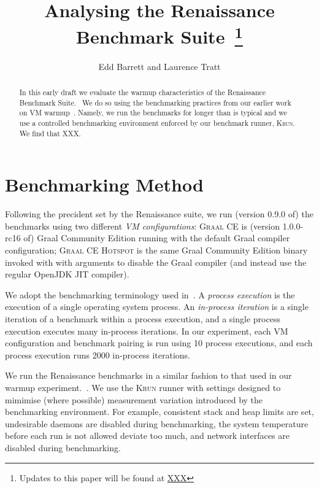 \documentclass[a4paper]{article}
\newcommand{\krun}{\textsc{Krun}\xspace}
\newcommand{\graalce}{\textsc{Graal CE}\xspace}
\newcommand{\graalcehs}{\textsc{Graal CE Hotspot}\xspace}
\begin{document}
\title{Analysing the Renaissance Benchmark Suite~\footnote{Updates to this paper will be found at \url{XXX}}}

\author{Edd Barrett and Laurence Tratt}

\maketitle

\begin{abstract}
\noindent In this early draft we evaluate the warmup characteristics of the
Renaissance Benchmark Suite.~\cite{prokopec19renaissance} We do so using the
benchmarking practices from our earlier work on VM
warmup~\cite{barrett16warmup}. Namely, we run the benchmarks for longer than is
typical and we use a controlled benchmarking environment enforced by our
benchmark runner, \krun. We find that XXX.
\end{abstract}

\section{Benchmarking Method}
\label{sec:eval}

Following the precident set by the Renaissance suite, we run (version 0.9.0 of)
the benchmarks using two different \emph{VM configurations}: \graalce is
(version 1.0.0-rc16 of) Graal Community Edition running with the default Graal
compiler configuration; \graalcehs is the same Graal Community Edition binary
invoked with with arguments to disable the Graal compiler (and instead use the
regular OpenJDK JIT compiler).

We adopt the benchmarking terminology used in~\cite{barrett16warmup}. A
\emph{process execution} is the execution of a single operating system process.
An \emph{in-process iteration} is a single iteration of a benchmark within a
process execution, and a single process execution executes many in-process
iterations. In our experiment, each VM configuration and benchmark pairing is
run using 10 process executions, and each process execution runs 2000
in-process iterations.

We run the Renaissance benchmarks in a similar fashion to that used in our
warmup experiment.~\cite{barrett16warmup}. We use the \krun runner with
settings designed to mimimise (where possible) measurement variation introduced
by the benchmarking environment. For example, consistent stack and heap limits
are set, undesirable daemons are disabled during benchmarking, the system
temperature before each run is not allowed deviate too much, and network
interfaces are disabled during benchmarking.
\end{document}
